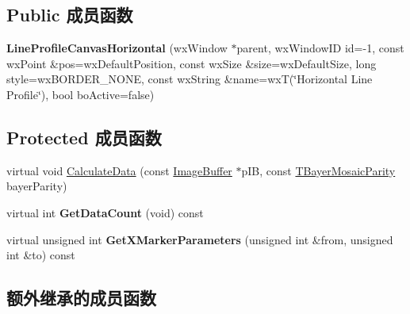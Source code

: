 \subsection*{Public 成员函数}
\begin{DoxyCompactItemize}
\item 
\hypertarget{class_line_profile_canvas_horizontal_a602412673896e950f7ef66b1c7a0aefe}{{\bfseries Line\+Profile\+Canvas\+Horizontal} (wx\+Window $\ast$parent, wx\+Window\+I\+D id=-\/1, const wx\+Point \&pos=wx\+Default\+Position, const wx\+Size \&size=wx\+Default\+Size, long style=wx\+B\+O\+R\+D\+E\+R\+\_\+\+N\+O\+N\+E, const wx\+String \&name=wx\+T(\char`\"{}Horizontal Line Profile\char`\"{}), bool bo\+Active=false)}\label{class_line_profile_canvas_horizontal_a602412673896e950f7ef66b1c7a0aefe}

\end{DoxyCompactItemize}
\subsection*{Protected 成员函数}
\begin{DoxyCompactItemize}
\item 
virtual void \hyperlink{class_line_profile_canvas_horizontal_ad668720e03d2799e26a82a9bc235e405}{Calculate\+Data} (const \hyperlink{struct_image_buffer}{Image\+Buffer} $\ast$p\+I\+B, const \hyperlink{group___common_interface_ga9e2a1b46f3ed21b46b867c6d88d25598}{T\+Bayer\+Mosaic\+Parity} bayer\+Parity)
\item 
\hypertarget{class_line_profile_canvas_horizontal_a50c1e3422bd24f05f599acc952b9eb7d}{virtual int {\bfseries Get\+Data\+Count} (void) const }\label{class_line_profile_canvas_horizontal_a50c1e3422bd24f05f599acc952b9eb7d}

\item 
\hypertarget{class_line_profile_canvas_horizontal_a279b3509b8664a8157e0ba00a65fb65f}{virtual unsigned int {\bfseries Get\+X\+Marker\+Parameters} (unsigned int \&from, unsigned int \&to) const }\label{class_line_profile_canvas_horizontal_a279b3509b8664a8157e0ba00a65fb65f}

\end{DoxyCompactItemize}
\subsection*{额外继承的成员函数}


